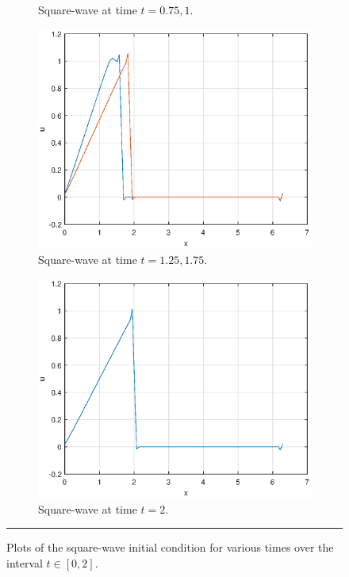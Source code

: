 \documentclass[a4paper, 12pt]{article}
\begin{document}
\begin{figure}[H]
\begin{subfigure}[b]{0.5\textwidth}
\caption{Square-wave at time $t=0.75,1$.}%
\end{subfigure}
\begin{subfigure}[b]{0.5\textwidth}
\includegraphics[width=\textwidth]{Q3square_t=175}\hfill
\caption{Square-wave at time $t=1.25,1.75$.}%
\end{subfigure}
\begin{subfigure}[b]{0.5\textwidth}
\includegraphics[width=\textwidth]{Q3square_t=2}\hfill
\caption{Square-wave at time $t=2$.}%
\end{subfigure}
\caption{Plots of the square-wave initial condition for various times over the interval $t\in[0,2]$.}
\rule{\linewidth}{.4pt}
\end{figure}
\end{document}

